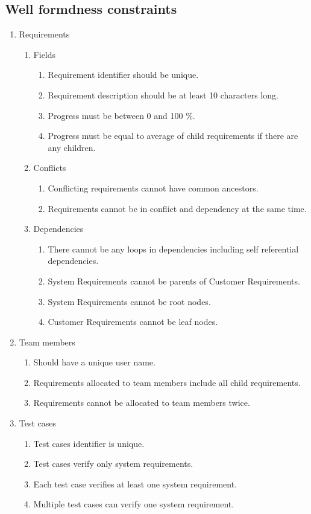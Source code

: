 \documentclass[11pt,a4paper]{scrartcl}
\begin{document}
\subsection{Well formdness constraints}
\begin{enumerate}
	\item Requirements
	\begin{enumerate}
		\item Fields
		\begin{enumerate}
			\item Requirement identifier should be unique.
			\item Requirement description should be at least 10 characters long.
			\item Progress must be between 0 and 100 \%.
			\item Progress must be equal to average of child requirements if there are any children.
		\end{enumerate}
		
		\item Conflicts
		\begin{enumerate}
			\item Conflicting requirements cannot have common ancestors.
			\item Requirements cannot be in conflict and dependency at the same time.
		\end{enumerate}
		
		\item Dependencies
		\begin{enumerate}
			\item There cannot be any loops in dependencies including self referential dependencies.
			\item System Requirements cannot be parents of Customer Requirements.
			\item System Requirements cannot be root nodes.
			\item Customer Requirements cannot be leaf nodes.	
		\end{enumerate}
		
	\end{enumerate}
	
	\item Team members
	\begin{enumerate}
		\item Should have a unique user name.
		\item Requirements allocated to team members include all child requirements.
		\item Requirements cannot be allocated to team members twice.
	\end{enumerate}
	
	\item Test cases
	\begin{enumerate}
		\item Test cases identifier is unique.
		\item Test cases verify only system requirements.
		\item Each test case verifies at least one system requirement.
		\item Multiple test cases can verify one system requirement.
	\end{enumerate}
\end{enumerate}
\end{document}
